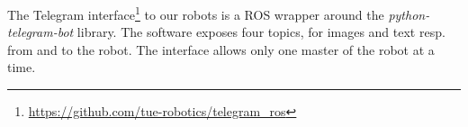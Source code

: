 \label{ssec:telegram}
The Telegram interface\footnote{\url{https://github.com/tue-robotics/telegram_ros}} to our robots is a ROS wrapper around the \emph{python-telegram-bot} library. The software exposes four topics, for images and text resp. from and to the robot.
The interface allows only one master of the robot at a time.


